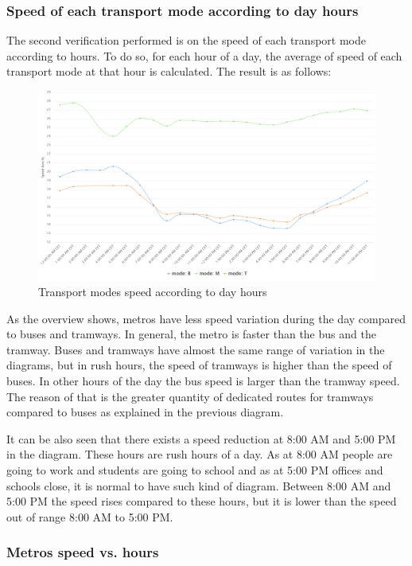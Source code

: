 \documentclass{article}
\begin{document}
\subsubsection{Speed of each transport mode according to day hours}
The second verification 
performed is on the speed of each transport mode according to hours. To do so, for each hour of a day, the average of speed of each transport mode at that hour is calculated. The result is as follows:
 \begin{figure}[H]
    \centering
    \includegraphics[width=\textwidth]{images/Speed_hour.png} 
    \caption{Transport modes speed according to day hours}
\end{figure}
As the overview shows, metros have less speed variation during the day compared to buses and tramways. In general, the metro is faster than the bus and the tramway. Buses and tramways have almost the same range of variation in the diagrams, but in rush hours, the speed of tramways is higher than the speed of buses. In other hours of the day the bus speed is larger than the tramway speed. The reason of that is the greater quantity of dedicated routes for tramways compared to buses as explained in the previous diagram.

It can be also seen that there exists a speed reduction at 8:00 AM and 5:00 PM in the diagram. These hours are rush hours of a day. As at 8:00 AM people are going to work and students are going to school and as at 5:00 PM offices and schools close, it is normal to have such kind of diagram. Between 8:00 AM and 5:00 PM the speed rises compared to these hours, but it is lower than the speed out of range 8:00 AM to 5:00 PM.


\subsubsection{Metros speed vs. hours}
\end{document}
